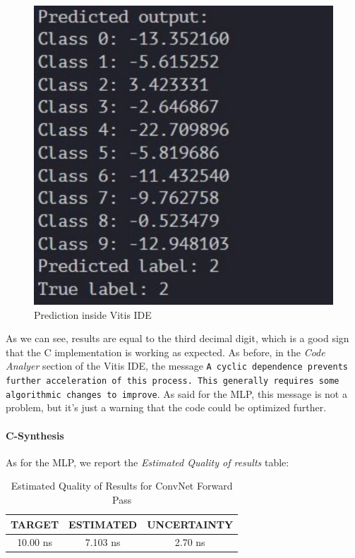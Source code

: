 \documentclass{article}
\begin{document}
\begin{figure}[H]
\begin{minipage}{0.49\textwidth}
        \includegraphics[width=1\textwidth]{assets/ConvNet/vitis-model-prediction.jpg}
        \caption{Prediction inside Vitis IDE}
        \label{fig:convnet-vitis-prediction}
    \end{minipage}
\end{figure}

As we can see, results are equal to the third decimal digit, which is a good sign that the C implementation is working as expected. As before, in the \textit{Code Analyer} section of the Vitis IDE, the message \texttt{A cyclic dependence prevents further acceleration of this process. This generally requires some algorithmic changes to improve}. As said for the MLP, this message is not a problem, but it's just a warning that the code could be optimized further.

\paragraph{C-Synthesis}
As for the MLP, we report the \textit{Estimated Quality of results} table:

\begin{table}[H]
    \centering
    \begin{tabular}{|c|c|c|}
        \hline
        \textbf{TARGET} & \textbf{ESTIMATED} & \textbf{UNCERTAINTY} \\
        \hline
        10.00 ns & 7.103 ns & 2.70 ns \\
        \hline
    \end{tabular}
    \caption{\centering Estimated Quality of Results for ConvNet Forward Pass}
    \label{tab:convnet-quality}
\end{table}
\end{document}
